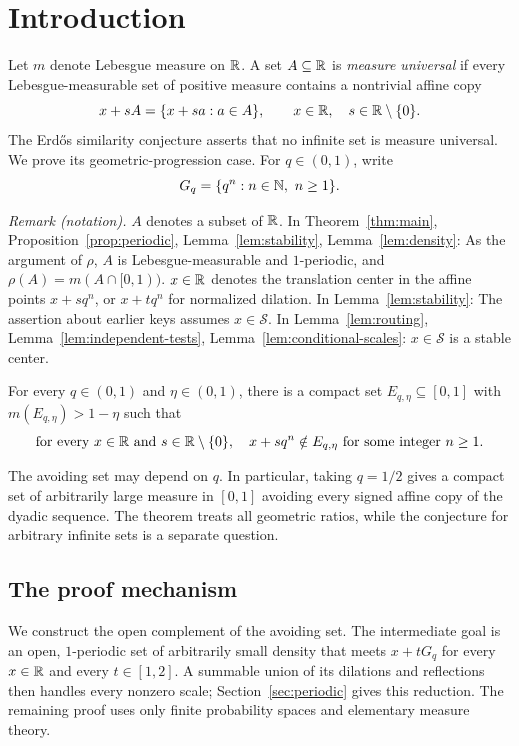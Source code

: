 \section{Introduction}\label{sec:introduction}

Let $m$ denote Lebesgue measure on $\mathbb R$. A set $A\subseteq\mathbb R$ is
\emph{measure universal} if every Lebesgue-measurable set of positive
measure contains a nontrivial affine copy
\[
 x+sA=\{x+sa:a\in A\},\qquad x\in\mathbb R,\quad s\in\mathbb R\setminus\{0\}.
\]
The Erd\H{o}s similarity conjecture \cite[Problem~4.33.7*]{Erdos1974Problems}
asserts that no infinite set is measure universal. We prove its
geometric-progression case. For
$q\in(0,1)$, write
\[
 G_q=\{q^n:n\in\N,\ n\ge1\}.
\]

\noindent\textit{Remark (notation).} $A$ denotes a subset of $\mathbb R$. In Theorem~\ref{thm:main}, Proposition~\ref{prop:periodic}, Lemma~\ref{lem:stability}, Lemma~\ref{lem:density}: As the argument of $\rho$, $A$ is Lebesgue-measurable and $1$-periodic, and $\rho(A)=m(A\cap[0,1))$. $x\in\mathbb R$ denotes the translation center in the affine points $x+sq^n$, or $x+tq^n$ for normalized dilation. In Lemma~\ref{lem:stability}: The assertion about earlier keys assumes $x\in\mathcal S$. In Lemma~\ref{lem:routing}, Lemma~\ref{lem:independent-tests}, Lemma~\ref{lem:conditional-scales}: $x\in\mathcal S$ is a stable center.


\begin{theorem}\label{thm:main}
For every $q\in(0,1)$ and $\eta\in(0,1)$, there is a compact set
$E_{q,\eta}\subseteq[0,1]$ with $m(E_{q,\eta})>1-\eta$ such that
\[
 \text{for every }x\in\mathbb R\text{ and }s\in\mathbb R\setminus\{0\},
 \quad x+sq^n\notin E_{q,\eta}\text{ for some integer }n\ge1.
\]
\end{theorem}

The avoiding set may depend on $q$. In particular, taking $q=1/2$
gives a compact set of arbitrarily large measure in $[0,1]$ avoiding
every signed affine copy of the dyadic sequence. The theorem treats
all geometric ratios, while the conjecture for arbitrary infinite
sets is a separate question.



\subsection{The proof mechanism}

We construct the open complement of the avoiding set. The intermediate
goal is an open, $1$-periodic set of arbitrarily small density that meets
$x+tG_q$ for every $x\in\mathbb R$ and every $t\in[1,2]$. A summable union
of its dilations and reflections then handles every nonzero scale;
Section~\ref{sec:periodic} gives this reduction. The remaining proof
uses only finite probability spaces and elementary measure theory.

